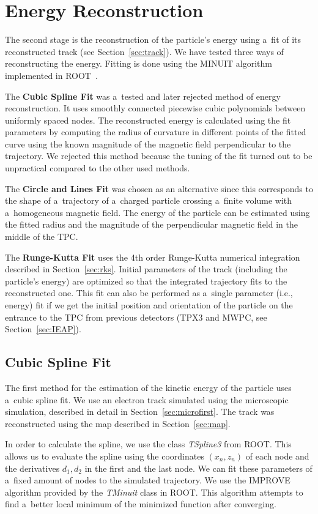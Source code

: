 \chapter{Energy Reconstruction}
\label{sec:energy}
	The second stage is the reconstruction of the particle's energy using a~fit of its reconstructed track (see Section~\ref{sec:track}). We have tested three ways of reconstructing the energy. Fitting is done using the MINUIT algorithm implemented in ROOT~\cite{ROOT}.
	
	The \textbf{Cubic Spline Fit} was a~tested and later rejected method of energy reconstruction. It uses smoothly connected piecewise cubic polynomials between uniformly spaced nodes. The reconstructed energy is calculated using the fit parameters by computing the radius of curvature in different points of the fitted curve using the known magnitude of the magnetic field perpendicular to the trajectory. We rejected this method because the tuning of the fit turned out to be unpractical compared to the other used methods.
	
	The \textbf{Circle and Lines Fit} was chosen as an alternative since this corresponds to the shape of a~trajectory of a~charged particle crossing a~finite volume with a~homogeneous magnetic field. The energy of the particle can be estimated using the fitted radius and the magnitude of the perpendicular magnetic field in the middle of the \ac{TPC}.
	
	The \textbf{Runge-Kutta Fit} uses the 4th order Runge-Kutta numerical integration described in Section~\ref{sec:rks}. Initial parameters of the track (including the particle's energy) are optimized so that the integrated trajectory fits to the reconstructed one. This fit can also be performed as a~single parameter (i.e., energy) fit if we get the initial position and orientation of the particle on the entrance to the \ac{TPC} from previous detectors (\ac{TPX3} and \ac{MWPC}, see Section~\ref{sec:IEAP}).
	
	\section{Cubic Spline Fit}
	\label{sec:cspline}
		The first method for the estimation of the kinetic energy of the particle uses a~cubic spline fit. We use an electron track simulated using the microscopic simulation, described in detail in Section~\ref{sec:microfirst}. The track was reconstructed using the map described in Section~\ref{sec:map}.
				
		In order to calculate the spline, we use the class \textit{TSpline3} from ROOT. This allows us to evaluate the spline using the coordinates $(x_n,z_n)$ of each node and the derivatives $d_1,d_2$ in the first and the last node. We can fit these parameters of a~fixed amount of nodes to the simulated trajectory. We use the IMPROVE algorithm provided by the \textit{TMinuit} class in ROOT. This algorithm attempts to find a~better local minimum of the minimized function after converging.
		
